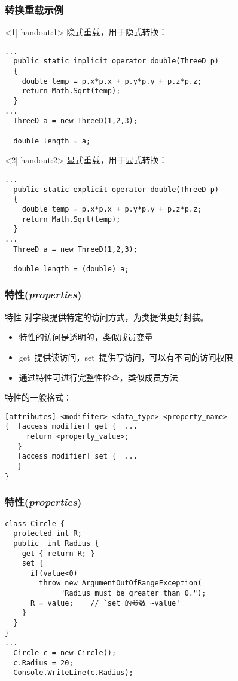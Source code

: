 \begin{frame}[fragile]
\frametitle{转换重载示例}
\begin{onlyenv}<1| handout:1>
隐式重载，用于隐式转换：
\begin{lstlisting}
...
  public static implicit operator double(ThreeD p)
  {
    double temp = p.x*p.x + p.y*p.y + p.z*p.z;
    return Math.Sqrt(temp);
  }
...
  ThreeD a = new ThreeD(1,2,3);

  double length = a;

\end{lstlisting}
\end{onlyenv}
\begin{onlyenv}<2| handout:2>
显式重载，用于显式转换：
\begin{lstlisting}
...
  public static explicit operator double(ThreeD p)
  {
    double temp = p.x*p.x + p.y*p.y + p.z*p.z;
    return Math.Sqrt(temp);
  }
...
  ThreeD a = new ThreeD(1,2,3);

  double length = (double) a;

\end{lstlisting}
\end{onlyenv}
\end{frame}

\begin{frame}[fragile]
\frametitle{特性(\textit{properties})}
\begin{block}{特性}
\CJKindent 对字段提供特定的访问方式，为类提供更好封装。
\end{block}
\begin{itemize}
\item 特性的访问是透明的，类似成员变量
\item get~提供读访问，set~提供写访问，可以有不同的访问权限
\item 通过特性可进行完整性检查，类似成员方法
\end{itemize}
\pause
特性的一般格式：
\begin{lstlisting}
[attributes] <modifiter> <data_type> <property_name>
{  [access modifier] get {  ...
     return <property_value>;
   }
   [access modifier] set {  ...  
   }
}
\end{lstlisting}
\end{frame}

\begin{frame}[fragile]
\frametitle{特性(\textit{properties})}
\begin{lstlisting}[escapeinside=`']
class Circle {
  protected int R;
  public  int Radius {
    get { return R; }
    set {
      if(value<0)
        throw new ArgumentOutOfRangeException(
             "Radius must be greater than 0.");
      R = value;    // `set 的参数 ~value'
    }
  }
}
...
  Circle c = new Circle();
  c.Radius = 20;
  Console.WriteLine(c.Radius);

\end{lstlisting}
\end{frame}

